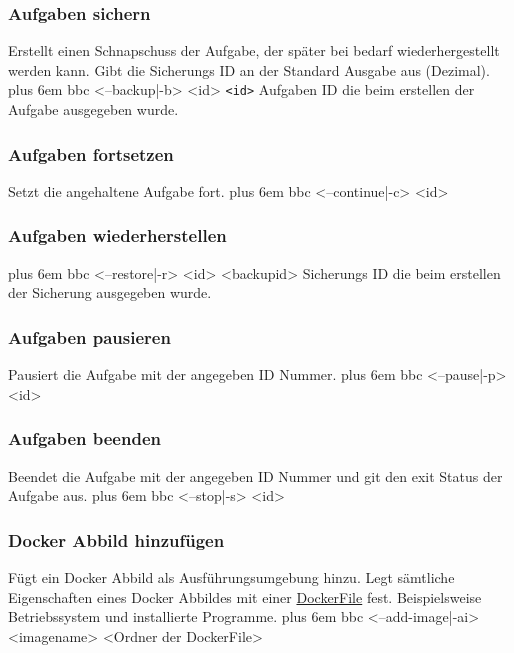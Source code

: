 \documentclass[a4paper,12pt]{article}
\makeatletter
\newenvironment{mycode}
 {\def\@xobeysp{\ }\verbatim\rightskip=0pt plus 6em\relax}
 {\endverbatim}
\makeatother
\begin{document}
\subsubsection{Aufgaben sichern}
Erstellt einen Schnapschuss der Aufgabe, der später bei bedarf wiederhergestellt werden kann.
Gibt die Sicherungs ID an der Standard Ausgabe aus (Dezimal).
\begin{mycode}
bbc <--backup|-b> <id>
\end{mycode}
\texttt{<id>} Aufgaben ID die beim erstellen der Aufgabe ausgegeben wurde.

\subsubsection{Aufgaben fortsetzen}
Setzt die angehaltene Aufgabe fort.
\begin{mycode}
bbc <--continue|-c> <id>
\end{mycode}

\subsubsection{Aufgaben wiederherstellen}
\begin{mycode}
bbc <--restore|-r> <id> <backupid>
\end{mycode}
Sicherungs ID die beim erstellen der Sicherung ausgegeben wurde.

\subsubsection{Aufgaben pausieren}
Pausiert die Aufgabe mit der angegeben ID Nummer.
\begin{mycode}
bbc <--pause|-p> <id>
\end{mycode}

\subsubsection{Aufgaben beenden}
Beendet die Aufgabe mit der angegeben ID Nummer und git den exit Status der Aufgabe aus.
\begin{mycode}
bbc <--stop|-s> <id>
\end{mycode}

\subsubsection{Docker Abbild hinzufügen}
Fügt ein Docker Abbild als Ausführungsumgebung hinzu.
Legt sämtliche Eigenschaften eines Docker Abbildes mit einer \href{https://docs.docker.com/engine/reference/builder/}{DockerFile} fest.
Beispielsweise Betriebssystem und installierte Programme. 
\begin{mycode}
bbc <--add-image|-ai> <imagename> <Ordner der DockerFile>
\end{mycode}
\end{document}
